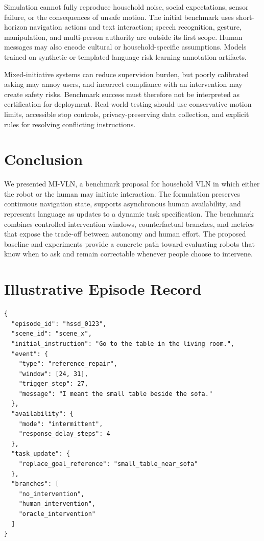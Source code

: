 \documentclass[10pt]{article}
\newcommand{\method}{MI-VLN}
\begin{document}
Simulation cannot fully reproduce household noise, social expectations, sensor
failure, or the consequences of unsafe motion. The initial benchmark uses
short-horizon navigation actions and text interaction; speech recognition,
gesture, manipulation, and multi-person authority are outside its first scope.
Human messages may also encode cultural or household-specific assumptions.
Models trained on synthetic or templated language risk learning annotation
artifacts.

Mixed-initiative systems can reduce supervision burden, but poorly calibrated
asking may annoy users, and incorrect compliance with an intervention may
create safety risks. Benchmark success must therefore not be interpreted as
certification for deployment. Real-world testing should use conservative
motion limits, accessible stop controls, privacy-preserving data collection,
and explicit rules for resolving conflicting instructions.

\section{Conclusion}
\label{sec:conclusion}

We presented \method, a benchmark proposal for household VLN in which either
the robot or the human may initiate interaction. The formulation preserves
continuous navigation state, supports asynchronous human availability, and
represents language as updates to a dynamic task specification. The benchmark
combines controlled intervention windows, counterfactual branches, and metrics
that expose the trade-off between autonomy and human effort. The proposed
baseline and experiments provide a concrete path toward evaluating robots that
know when to ask and remain correctable whenever people choose to intervene.

\appendix

\section{Illustrative Episode Record}
\label{app:schema}

\begin{verbatim}
{
  "episode_id": "hssd_0123",
  "scene_id": "scene_x",
  "initial_instruction": "Go to the table in the living room.",
  "event": {
    "type": "reference_repair",
    "window": [24, 31],
    "trigger_step": 27,
    "message": "I meant the small table beside the sofa."
  },
  "availability": {
    "mode": "intermittent",
    "response_delay_steps": 4
  },
  "task_update": {
    "replace_goal_reference": "small_table_near_sofa"
  },
  "branches": [
    "no_intervention",
    "human_intervention",
    "oracle_intervention"
  ]
}
\end{verbatim}
\end{document}
